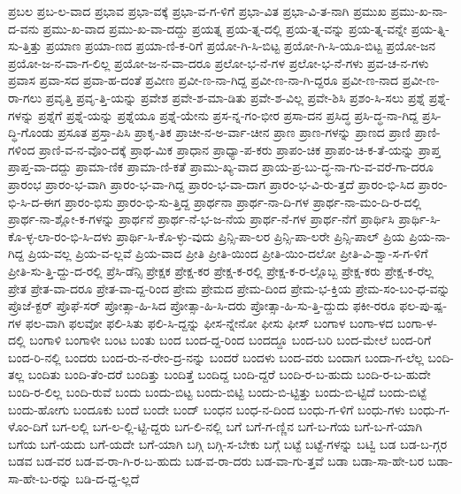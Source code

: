 {ಪ್ರಬಲ
ಪ್ರಬ-ಲ-ವಾದ
ಪ್ರಭಾವ
ಪ್ರಭಾ-ವಕ್ಕೆ
ಪ್ರಭಾ-ವ-ಗ-ಳಿಗೆ
ಪ್ರಭಾ-ವಿತ
ಪ್ರಭಾ-ವಿ-ತ-ನಾಗಿ
ಪ್ರಮುಖ
ಪ್ರಮು-ಖ-ನಾ-ದ-ವನು
ಪ್ರಮು-ಖ-ವಾದ
ಪ್ರಮು-ಖ-ವಾ-ದದ್ದು
ಪ್ರಯತ್ನ
ಪ್ರಯ-ತ್ನ-ದಲ್ಲಿ
ಪ್ರಯ-ತ್ನ-ವನ್ನು
ಪ್ರಯ-ತ್ನ-ವನ್ನೇ
ಪ್ರಯ-ತ್ನಿ-ಸು-ತ್ತಿತ್ತು
ಪ್ರಯಾಣ
ಪ್ರಯಾ-ಣದ
ಪ್ರಯಾ-ಣಿ-ಕ-ರಿಗೆ
ಪ್ರಯೋ-ಗಿ-ಸಿ-ಬಿಟ್ಟ
ಪ್ರಯೋ-ಗಿ-ಸಿ-ಯೂ-ಬಿಟ್ಟ
ಪ್ರಯೋ-ಜನ
ಪ್ರಯೋ-ಜ-ನ-ವಾ-ಗ-ಲಿಲ್ಲ
ಪ್ರಯೋ-ಜ-ನ-ವಾ-ದರೂ
ಪ್ರಲೋ-ಭ-ನೆ-ಗಳ
ಪ್ರಲೋ-ಭ-ನೆ-ಗಳು
ಪ್ರವ-ಚ-ನ-ಗಳು
ಪ್ರವಾಸ
ಪ್ರವಾ-ಸದ
ಪ್ರವಾ-ಹ-ದಂತೆ
ಪ್ರವೀಣ
ಪ್ರವೀ-ಣ-ನಾ-ಗಿದ್ದ
ಪ್ರವೀ-ಣ-ನಾ-ಗಿ-ದ್ದರೂ
ಪ್ರವೀ-ಣ-ನಾದ
ಪ್ರವೀ-ಣ-ರಾ-ಗಲು
ಪ್ರವೃತ್ತಿ
ಪ್ರವೃ-ತ್ತಿ-ಯನ್ನು
ಪ್ರವೇಶ
ಪ್ರವೇ-ಶ-ಮಾ-ಡಿತು
ಪ್ರವೇ-ಶ-ವಿಲ್ಲ
ಪ್ರವೇ-ಶಿಸಿ
ಪ್ರಶಂ-ಸಿ-ಸಲು
ಪ್ರಶ್ನೆ
ಪ್ರಶ್ನೆ-ಗಳನ್ನು
ಪ್ರಶ್ನೆಗೆ
ಪ್ರಶ್ನೆ-ಯನ್ನು
ಪ್ರಶ್ನೆಯೂ
ಪ್ರಶ್ನೆ-ಯೇನು
ಪ್ರಸ-ನ್ನ-ಗಂ-ಭೀರ
ಪ್ರಸಾ-ದನ
ಪ್ರಸಿದ್ಧ
ಪ್ರಸಿ-ದ್ಧ-ನಾ-ಗಿದ್ದ
ಪ್ರಸಿ-ದ್ಧಿ-ಗೊಂಡು
ಪ್ರಸೂತ
ಪ್ರಸ್ತಾ-ಪಿಸಿ
ಪ್ರಾಕೃ-ತಿಕ
ಪ್ರಾಚೀ-ನ-ಅ-ರ್ವಾ-ಚೀನ
ಪ್ರಾಣ
ಪ್ರಾಣ-ಗಳನ್ನು
ಪ್ರಾಣದ
ಪ್ರಾಣಿ
ಪ್ರಾಣಿ-ಗಳಿಂದ
ಪ್ರಾಣಿ-ವ-ನ-ವೊಂ-ದಕ್ಕೆ
ಪ್ರಾಥ-ಮಿಕ
ಪ್ರಾಧಾನ
ಪ್ರಾಧ್ಯಾ-ಪ-ಕರು
ಪ್ರಾಪಂ-ಚಿಕ
ಪ್ರಾಪಂ-ಚಿ-ಕ-ತೆ-ಯನ್ನು
ಪ್ರಾಪ್ತ
ಪ್ರಾಪ್ತ-ವಾ-ದದ್ದು
ಪ್ರಾಮಾ-ಣಿಕ
ಪ್ರಾಮಾ-ಣಿ-ಕತೆ
ಪ್ರಾಮು-ಖ್ಯ-ವಾದ
ಪ್ರಾಯ-ಪ್ರ-ಬು-ದ್ಧ-ನಾ-ಗು-ವ-ವರೆ-ಗಾ-ದರೂ
ಪ್ರಾರಂಭ
ಪ್ರಾರಂ-ಭ-ವಾಗಿ
ಪ್ರಾರಂ-ಭ-ವಾ-ಗಿದ್ದ
ಪ್ರಾರಂ-ಭ-ವಾ-ದಾಗ
ಪ್ರಾರಂ-ಭ-ವಿ-ರು-ತ್ತದೆ
ಪ್ರಾರಂ-ಭಿ-ಸಿದ
ಪ್ರಾರಂ-ಭಿ-ಸಿ-ದ-ಈಗ
ಪ್ರಾರಂ-ಭಿಸು
ಪ್ರಾರಂ-ಭಿ-ಸು-ತ್ತಿದ್ದ
ಪ್ರಾರ್ಥನಾ
ಪ್ರಾರ್ಥ-ನಾ-ದಿ-ಗಳ
ಪ್ರಾರ್ಥ-ನಾ-ಮಂ-ದಿ-ರ-ದಲ್ಲಿ
ಪ್ರಾರ್ಥ-ನಾ-ಶ್ಲೋ-ಕ-ಗಳನ್ನು
ಪ್ರಾರ್ಥನೆ
ಪ್ರಾರ್ಥ-ನೆ-ಭ-ಜ-ನೆಯ
ಪ್ರಾರ್ಥ-ನೆ-ಗಳ
ಪ್ರಾರ್ಥ-ನೆಗೆ
ಪ್ರಾರ್ಥಿಸಿ
ಪ್ರಾರ್ಥಿ-ಸಿ-ಕೊ-ಳ್ಳ-ಲಾ-ರಂ-ಭಿ-ಸಿ-ದಳು
ಪ್ರಾರ್ಥಿ-ಸಿ-ಕೊ-ಳ್ಳು-ವುದು
ಪ್ರಿನ್ಸಿ-ಪಾ-ಲರ
ಪ್ರಿನ್ಸಿ-ಪಾ-ಲರೇ
ಪ್ರಿನ್ಸಿ-ಪಾಲ್
ಪ್ರಿಯ
ಪ್ರಿಯ-ನಾ-ಗಿದ್ದ
ಪ್ರಿಯ-ವಲ್ಲ
ಪ್ರಿಯ-ವ-ಲ್ಲವೆ
ಪ್ರಿಯ-ವಾದ
ಪ್ರೀತಿ
ಪ್ರೀತಿ-ಯಿಂದ
ಪ್ರೀತಿ-ಯಿಂ-ದಲೋ
ಪ್ರೀತಿ-ವಿ-ಶ್ವಾ-ಸ-ಗ-ಳಿಗೆ
ಪ್ರೀತಿ-ಸು-ತ್ತಿ-ದ್ದು-ದ-ರಲ್ಲಿ
ಪ್ರೆಸಿ-ಡೆನ್ಸಿ
ಪ್ರೇಕ್ಷಕ
ಪ್ರೇಕ್ಷ-ಕರ
ಪ್ರೇಕ್ಷ-ಕ-ರಲ್ಲಿ
ಪ್ರೇಕ್ಷ-ಕ-ರ-ಲ್ಲೊಬ್ಬ
ಪ್ರೇಕ್ಷ-ಕರು
ಪ್ರೇಕ್ಷ-ಕ-ರೆಲ್ಲ
ಪ್ರೇತ
ಪ್ರೇತ-ವಾ-ದರೂ
ಪ್ರೇತ-ವಾ-ದ್ದ-ರಿಂದ
ಪ್ರೇಮ
ಪ್ರೇಮದ
ಪ್ರೇಮ-ದಿಂದ
ಪ್ರೇಮ-ಭ-ಕ್ತಿಯ
ಪ್ರೇಮ-ಸಂ-ಬಂ-ಧ-ವನ್ನು
ಪ್ರೊಜೆ-ಕ್ಟರ್
ಪ್ರೊಫೆ-ಸರ್
ಪ್ರೋತ್ಸಾ-ಹಿ-ಸಿದ
ಪ್ರೋತ್ಸಾ-ಹಿ-ಸಿ-ದರು
ಪ್ರೋತ್ಸಾ-ಹಿ-ಸು-ತ್ತಿ-ದ್ದುದು
ಫಕೀ-ರರೂ
ಫಲ-ಪು-ಷ್ಪ-ಗಳ
ಫಲ-ವಾಗಿ
ಫಲವೋ
ಫಲಿ-ಸಿತು
ಫಲಿ-ಸಿ-ದ್ದನ್ನು
ಫೀಸ-ನ್ನೇನೋ
ಫೀಸು
ಫೀಸ್
ಬಂಗಾಳ
ಬಂಗಾ-ಳದ
ಬಂಗಾ-ಳ-ದಲ್ಲಿ
ಬಂಗಾಳಿ
ಬಂಗಾಳೀ
ಬಂಟ
ಬಂತು
ಬಂದ
ಬಂದ-ದ್ದ-ರಿಂದ
ಬಂದದ್ದೂ
ಬಂದ-ಬರಿ
ಬಂದ-ಮೇಲೆ
ಬಂದ-ರಿಗೆ
ಬಂದ-ರಿ-ನಲ್ಲಿ
ಬಂದರು
ಬಂದ-ರು-ನ-ರೇಂ-ದ್ರ-ನನ್ನು
ಬಂದರೆ
ಬಂದಳು
ಬಂದ-ವರು
ಬಂದಾಗ
ಬಂದಾ-ಗ-ಲೆಲ್ಲ
ಬಂದಿ-ತಲ್ಲ
ಬಂದಿತು
ಬಂದಿ-ತೆಂ-ದರೆ
ಬಂದಿತ್ತು
ಬಂದಿತ್ತೆ
ಬಂದಿದ್ದ
ಬಂದಿ-ದ್ದರೆ
ಬಂದಿ-ರ-ಬ-ಹುದು
ಬಂದಿ-ರ-ಬ-ಹುದೇ
ಬಂದಿ-ರ-ಲಿಲ್ಲ
ಬಂದಿ-ರುವೆ
ಬಂದು
ಬಂದು-ಬಿಟ್ಟ
ಬಂದು-ಬಿಟ್ಟಿ
ಬಂದು-ಬಿ-ಟ್ಟಿತ್ತು
ಬಂದು-ಬಿ-ಟ್ಟಿದೆ
ಬಂದು-ಬಿಟ್ಟೆ
ಬಂದು-ಹೋಗು
ಬಂದೂಕು
ಬಂದೆ
ಬಂದೇ
ಬಂದ್
ಬಂಧನ
ಬಂಧ-ನ-ದಿಂದ
ಬಂಧು-ಗ-ಳಿಗೆ
ಬಂಧು-ಗಳು
ಬಂಧು-ಗ-ಳೊಂ-ದಿಗೆ
ಬಗ-ಲಲ್ಲಿ
ಬಗ-ಲ-ಲ್ಲಿ-ಟ್ಟಿ-ದ್ದರು
ಬಗ-ಲಿ-ನಲ್ಲಿ
ಬಗೆ
ಬಗೆ-ಗ-ಣ್ಣಿನ
ಬಗೆ-ಬ-ಗೆಯ
ಬಗೆ-ಬ-ಗೆ-ಯಾಗಿ
ಬಗೆಯ
ಬಗೆ-ಯದು
ಬಗೆ-ಯದೇ
ಬಗೆ-ಯಾಗಿ
ಬಗ್ಗಿ
ಬಗ್ಗಿ-ಸ-ಬೇಕು
ಬಗ್ಗೆ
ಬಟ್ಟೆ
ಬಟ್ಟೆ-ಗಳನ್ನು
ಬಟ್ವಿ
ಬಡ
ಬಡ-ಬ-ಗ್ಗರ
ಬಡವ
ಬಡ-ವರ
ಬಡ-ವ-ರಾ-ಗಿ-ರ-ಬ-ಹುದು
ಬಡ-ವ-ರಾ-ದರು
ಬಡ-ವಾ-ಗು-ತ್ತವೆ
ಬಡಾ
ಬಡಾ-ಸಾ-ಹೇ-ಬರ
ಬಡಾ-ಸಾ-ಹೇ-ಬ-ರನ್ನು
ಬಡಿ-ದ-ದ್ದ-ಲ್ಲದೆ
}
